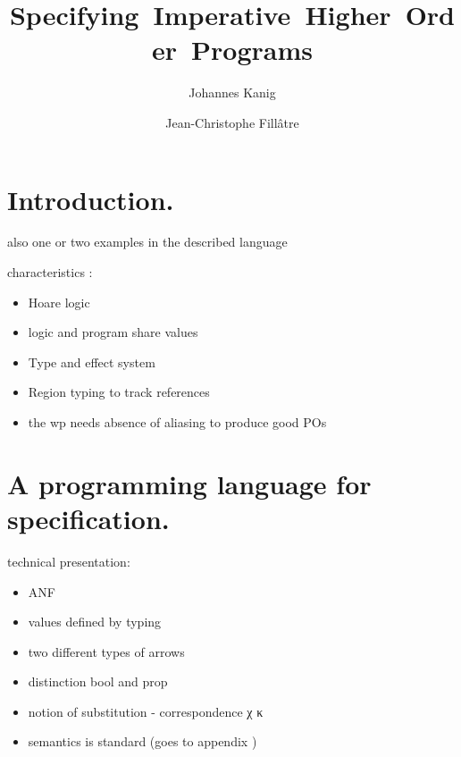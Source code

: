 \documentclass[a4paper]{llncs}
\begin{document}
\title{\mbox{Specifying Imperative Higher Order Programs}}

\author{Johannes Kanig \and Jean-Christophe Fill\^atre}

\maketitle

\begin{abstract}
\end{abstract}


\section{Introduction.}

also one or two examples in the described language

characteristics : 
\begin{itemize}
  \item Hoare logic
  \item logic and program share values  
  \item Type and effect system
  \item Region typing to track references
  \item the wp needs absence of aliasing to produce good POs
\end{itemize}

\section{A programming language for specification.}

technical presentation:
\begin{itemize}
  \item ANF
  \item values defined by typing 
  \item  two different types of arrows
  \item  distinction bool and prop
  \item  notion of substitution - correspondence χ κ
  \item semantics is standard (goes to appendix )
\end{itemize}
\end{document}

